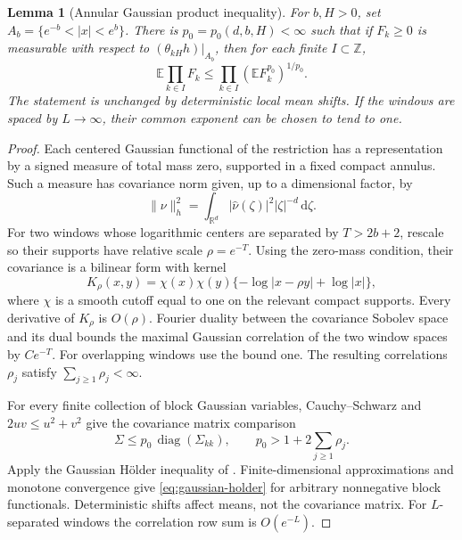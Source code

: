 \documentclass[11pt,reqno]{amsart}
\theoremstyle{plain}
\newtheorem{lemma}[theorem]{Lemma}
\theoremstyle{definition}
\theoremstyle{remark}
\newcommand{\R}{\mathbb R}
\newcommand{\E}{\mathbb E}
\newcommand{\1}{\mathbf{1}}
\newcommand{\dd}{\,\mathrm d}
\begin{document}
\begin{lemma}[Annular Gaussian product inequality]\label{lem:gaussian-holder}
For $b,H>0$, set $A_b=\{e^{-b}<|x|<e^b\}$. There is $p_0=p_0(d,b,H)<\infty$ such that if $F_k\ge0$ is measurable with respect to $(\theta_{kH}h)|_{A_b}$, then for each finite $I\subset\mathbb Z$,
\begin{equation}\label{eq:gaussian-holder}
\E\prod_{k\in I}F_k\le\prod_{k\in I}(\E F_k^{p_0})^{1/p_0}.
\end{equation}
The statement is unchanged by deterministic local mean shifts. If the windows are spaced by $L\to\infty$, their common exponent can be chosen to tend to one.
\end{lemma}
\begin{proof}
Each centered Gaussian functional of the restriction has a representation by a signed measure of total mass zero, supported in a fixed compact annulus. Such a measure has covariance norm given, up to a dimensional factor, by
\[
\|\nu\|_h^2=\int_{\R^d}|\widehat\nu(\zeta)|^2|\zeta|^{-d}\dd\zeta.
\]
For two windows whose logarithmic centers are separated by $T>2b+2$, rescale so their supports have relative scale $\rho=e^{-T}$. Using the zero-mass condition, their covariance is a bilinear form with kernel
\[
K_\rho(x,y)=\chi(x)\chi(y)\{-\log|x-\rho y|+\log|x|\},
\]
where $\chi$ is a smooth cutoff equal to one on the relevant compact supports. Every derivative of $K_\rho$ is $O(\rho)$. Fourier duality between the covariance Sobolev space and its dual bounds the maximal Gaussian correlation of the two window spaces by $Ce^{-T}$. For overlapping windows use the bound one. The resulting correlations $\rho_j$ satisfy $\sum_{j\ge1}\rho_j<\infty$.

For every finite collection of block Gaussian variables, Cauchy--Schwarz and $2uv\le u^2+v^2$ give the covariance matrix comparison
\[
\Sigma\le p_0\,\operatorname{diag}(\Sigma_{kk}),\qquad p_0>1+2\sum_{j\ge1}\rho_j.
\]
Apply the Gaussian H\"older inequality of \cite[Theorem 1(i)]{CDP}. Finite-dimensional approximations and monotone convergence give \eqref{eq:gaussian-holder} for arbitrary nonnegative block functionals. Deterministic shifts affect means, not the covariance matrix. For $L$-separated windows the correlation row sum is $O(e^{-L})$.
\end{proof}
\end{document}
